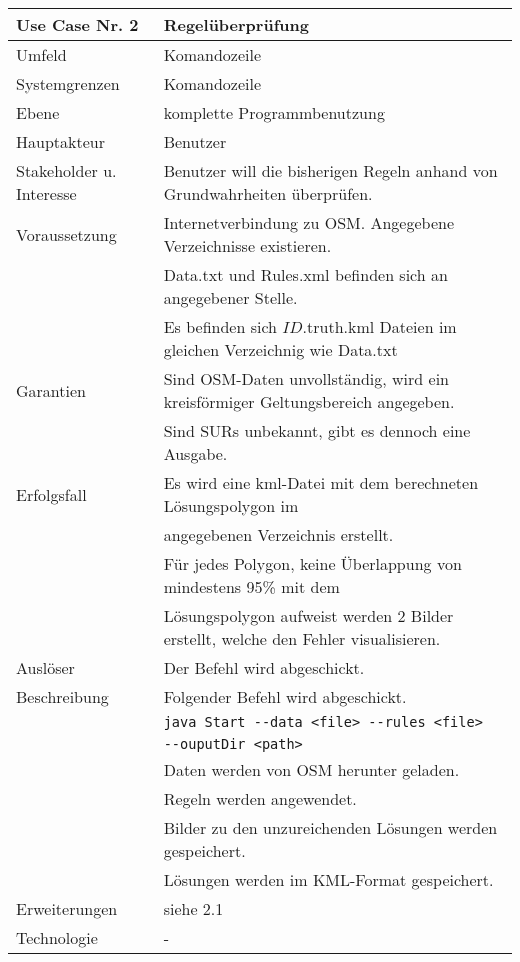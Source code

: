 \begin{tabular}{| l | l |}
 \hline
 \textbf{Use Case Nr. 2} & Regelüberprüfung \\
 \hline
 Umfeld & Komandozeile\\
 \hline
 Systemgrenzen & Komandozeile\\
 \hline
 Ebene & komplette Programmbenutzung\\
 \hline
 Hauptakteur & Benutzer\\
 \hline
 Stakeholder u. Interesse & Benutzer will die bisherigen Regeln anhand von Grundwahrheiten überprüfen.\\
 \hline
 Voraussetzung & Internetverbindung zu OSM. Angegebene Verzeichnisse existieren.\\
	      & Data.txt und Rules.xml befinden sich an angegebener Stelle. \\
	      & Es befinden sich $ID$.truth.kml Dateien im gleichen Verzeichnig wie Data.txt \\
 \hline
 Garantien & Sind OSM-Daten unvollständig, wird ein kreisförmiger Geltungsbereich angegeben.\\
	  & Sind SURs unbekannt, gibt es dennoch eine Ausgabe.\\
 \hline
 Erfolgsfall & Es wird eine kml-Datei mit dem berechneten Lösungspolygon im\\
	    & angegebenen Verzeichnis erstellt.\\
	    & Für jedes Polygon, keine Überlappung von mindestens 95\% mit dem \\
	    & Lösungspolygon aufweist werden 2 Bilder erstellt, welche den Fehler visualisieren.\\
 \hline
 Auslöser & Der Befehl wird abgeschickt.\\
 \hline
 Beschreibung & Folgender Befehl wird abgeschickt.\\
	    & \verb|java Start --data <file> --rules <file>|\\
	    & \hspace{24pt} \verb|--ouputDir <path>|\\
	    & Daten werden von OSM herunter geladen.\\
	    & Regeln werden angewendet.\\
	    & Bilder zu den unzureichenden Lösungen werden gespeichert.\\
	    & Lösungen werden im KML-Format gespeichert.\\
 \hline
 Erweiterungen & siehe 2.1\\
 \hline
 Technologie & -\\
 \hline
\end{tabular}


